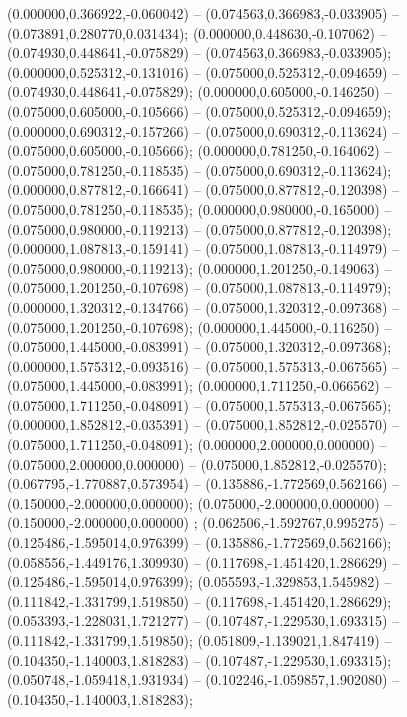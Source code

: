  (0.000000,0.366922,-0.060042) -- (0.074563,0.366983,-0.033905) -- (0.073891,0.280770,0.031434);
 (0.000000,0.448630,-0.107062) -- (0.074930,0.448641,-0.075829) -- (0.074563,0.366983,-0.033905);
 (0.000000,0.525312,-0.131016) -- (0.075000,0.525312,-0.094659) -- (0.074930,0.448641,-0.075829);
 (0.000000,0.605000,-0.146250) -- (0.075000,0.605000,-0.105666) -- (0.075000,0.525312,-0.094659);
 (0.000000,0.690312,-0.157266) -- (0.075000,0.690312,-0.113624) -- (0.075000,0.605000,-0.105666);
 (0.000000,0.781250,-0.164062) -- (0.075000,0.781250,-0.118535) -- (0.075000,0.690312,-0.113624);
 (0.000000,0.877812,-0.166641) -- (0.075000,0.877812,-0.120398) -- (0.075000,0.781250,-0.118535);
 (0.000000,0.980000,-0.165000) -- (0.075000,0.980000,-0.119213) -- (0.075000,0.877812,-0.120398);
 (0.000000,1.087813,-0.159141) -- (0.075000,1.087813,-0.114979) -- (0.075000,0.980000,-0.119213);
 (0.000000,1.201250,-0.149063) -- (0.075000,1.201250,-0.107698) -- (0.075000,1.087813,-0.114979);
 (0.000000,1.320312,-0.134766) -- (0.075000,1.320312,-0.097368) -- (0.075000,1.201250,-0.107698);
 (0.000000,1.445000,-0.116250) -- (0.075000,1.445000,-0.083991) -- (0.075000,1.320312,-0.097368);
 (0.000000,1.575312,-0.093516) -- (0.075000,1.575313,-0.067565) -- (0.075000,1.445000,-0.083991);
 (0.000000,1.711250,-0.066562) -- (0.075000,1.711250,-0.048091) -- (0.075000,1.575313,-0.067565);
 (0.000000,1.852812,-0.035391) -- (0.075000,1.852812,-0.025570) -- (0.075000,1.711250,-0.048091);
 (0.000000,2.000000,0.000000) -- (0.075000,2.000000,0.000000) -- (0.075000,1.852812,-0.025570);
 (0.067795,-1.770887,0.573954) -- (0.135886,-1.772569,0.562166) -- (0.150000,-2.000000,0.000000);
 (0.075000,-2.000000,0.000000) -- (0.150000,-2.000000,0.000000) ;
 (0.062506,-1.592767,0.995275) -- (0.125486,-1.595014,0.976399) -- (0.135886,-1.772569,0.562166);
 (0.058556,-1.449176,1.309930) -- (0.117698,-1.451420,1.286629) -- (0.125486,-1.595014,0.976399);
 (0.055593,-1.329853,1.545982) -- (0.111842,-1.331799,1.519850) -- (0.117698,-1.451420,1.286629);
 (0.053393,-1.228031,1.721277) -- (0.107487,-1.229530,1.693315) -- (0.111842,-1.331799,1.519850);
 (0.051809,-1.139021,1.847419) -- (0.104350,-1.140003,1.818283) -- (0.107487,-1.229530,1.693315);
 (0.050748,-1.059418,1.931934) -- (0.102246,-1.059857,1.902080) -- (0.104350,-1.140003,1.818283);
